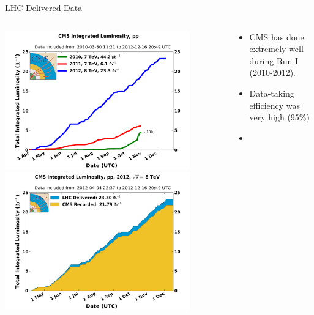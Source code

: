 \begin{frame}{LHC Delivered Data}

\begin{columns}
\begin{column}{0.5\textwidth}
\begin{center}
\includegraphics[width=0.85\textwidth]{images/int_lumi_cumulative_pp_2.pdf}\\
\includegraphics[width=0.85\textwidth]{images/int_lumi_per_day_cumulative_pp_2012.pdf}\\
\end{center}
\end{column}
\begin{column}{0.5\textwidth}
\begin{itemize}
\item
CMS has done extremely well during Run I (2010-2012).
\item
Data-taking efficiency was very high (95\%)
\item

\end{itemize}
\end{column}
\end{columns}
\end{frame}
